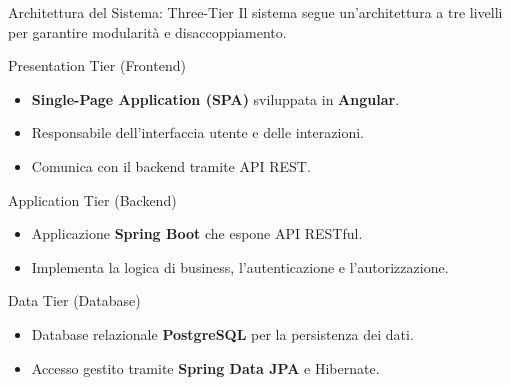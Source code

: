\documentclass[10pt]{beamer}
\begin{document}
\begin{frame}{Architettura del Sistema: Three-Tier}
    Il sistema segue un'architettura a tre livelli per garantire modularità e disaccoppiamento.
    \vspace{1em}

    \begin{block}{Presentation Tier (Frontend)}
        \begin{itemize}
            \item \textbf{Single-Page Application (SPA)} sviluppata in \textbf{Angular}.
            \item Responsabile dell'interfaccia utente e delle interazioni.
            \item Comunica con il backend tramite API REST.
        \end{itemize}
    \end{block}

    \begin{block}{Application Tier (Backend)}
        \begin{itemize}
            \item Applicazione \textbf{Spring Boot} che espone API RESTful.
            \item Implementa la logica di business, l'autenticazione e l'autorizzazione.
        \end{itemize}
    \end{block}

    \begin{block}{Data Tier (Database)}
        \begin{itemize}
            \item Database relazionale \textbf{PostgreSQL} per la persistenza dei dati.
            \item Accesso gestito tramite \textbf{Spring Data JPA} e Hibernate.
        \end{itemize}
    \end{block}
\end{frame}
\end{document}
